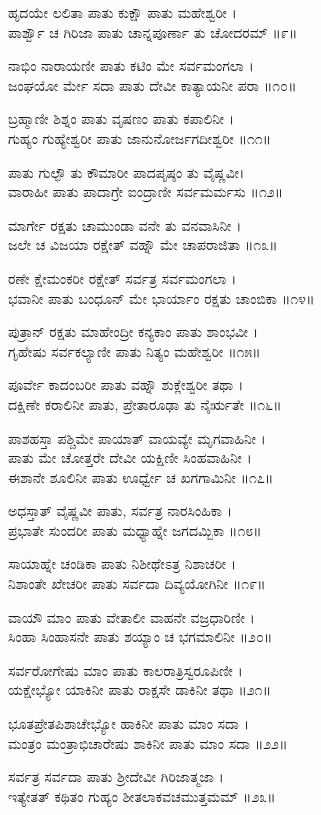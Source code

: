 ಹೃದಯೇ ಲಲಿತಾ ಪಾತು ಕುಕ್ಷೌ ಪಾತು ಮಹೇಶ್ವರೀ ।\\
ಪಾರ್ಶ್ವೌ ಚ ಗಿರಿಜಾ ಪಾತು ಚಾನ್ನಪೂರ್ಣಾ ತು ಚೋದರಮ್ ॥೯॥

ನಾಭಿಂ ನಾರಾಯಣೀ ಪಾತು ಕಟಿಂ ಮೇ ಸರ್ವಮಂಗಲಾ ।\\
ಜಂಘಯೋ ರ್ಮೇ ಸದಾ ಪಾತು ದೇವೀ ಕಾತ್ಯಾಯನೀ ಪರಾ ॥೧೦॥

ಬ್ರಹ್ಮಾಣೀ ಶಿಶ್ನಂ ಪಾತು ವೃಷಣಂ ಪಾತು ಕಪಾಲಿನೀ ।\\
ಗುಹ್ಯಂ ಗುಹ್ಯೇಶ್ವರೀ ಪಾತು ಜಾನುನೋರ್ಜಗದೀಶ್ವರೀ ॥೧೧॥

ಪಾತು ಗುಲ್ಫೌ ತು ಕೌಮಾರೀ ಪಾದಪೃಷ್ಠಂ ತು ವೈಷ್ಣವೀ।\\
ವಾರಾಹೀ ಪಾತು ಪಾದಾಗ್ರೇ ಐಂದ್ರಾಣೀ ಸರ್ವಮರ್ಮಸು ॥೧೨॥

ಮಾರ್ಗೇ ರಕ್ಷತು ಚಾಮುಂಡಾ ವನೇ ತು ವನವಾಸಿನೀ ।\\
ಜಲೇ ಚ ವಿಜಯಾ ರಕ್ಷೇತ್ ವಹ್ನೌ ಮೇ ಚಾಪರಾಜಿತಾ ॥೧೩॥

ರಣೇ ಕ್ಷೇಮಂಕರೀ ರಕ್ಷೇತ್ ಸರ್ವತ್ರ ಸರ್ವಮಂಗಲಾ ।\\
ಭವಾನೀ ಪಾತು ಬಂಧೂನ್ ಮೇ ಭಾರ್ಯಾಂ ರಕ್ಷತು ಚಾಂಬಿಕಾ ॥೧೪॥

ಪುತ್ರಾನ್ ರಕ್ಷತು ಮಾಹೇಂದ್ರೀ ಕನ್ಯಕಾಂ ಪಾತು ಶಾಂಭವೀ ।\\
ಗೃಹೇಷು ಸರ್ವಕಲ್ಯಾಣೀ ಪಾತು ನಿತ್ಯಂ ಮಹೇಶ್ವರೀ ॥೧೫॥

ಪೂರ್ವೇ ಕಾದಂಬರೀ ಪಾತು ವಹ್ನೌ ಶುಕ್ಲೇಶ್ವರೀ ತಥಾ ।\\
ದಕ್ಷಿಣೇ ಕರಾಲಿನೀ ಪಾತು, ಪ್ರೇತಾರೂಢಾ ತು ನೈರ್ಋತೇ ॥೧೬॥

ಪಾಶಹಸ್ತಾ ಪಶ್ಚಿಮೇ ಪಾಯಾತ್ ವಾಯವ್ಯೇ ಮೃಗವಾಹಿನೀ ।\\
ಪಾತು ಮೇ ಚೋತ್ತರೇ ದೇವೀ ಯಕ್ಷಿಣೀ ಸಿಂಹವಾಹಿನೀ ।\\
ಈಶಾನೇ ಶೂಲಿನೀ ಪಾತು ಊರ್ಧ್ವೇ ಚ ಖಗಗಾಮಿನೀ ॥೧೭॥

ಅಧಸ್ತಾತ್ ವೈಷ್ಣವೀ ಪಾತು, ಸರ್ವತ್ರ ನಾರಸಿಂಹಿಕಾ ।\\
ಪ್ರಭಾತೇ ಸುಂದರೀ ಪಾತು ಮಧ್ಯಾಹ್ನೇ ಜಗದಮ್ಬಿಕಾ ॥೧೮॥

ಸಾಯಾಹ್ನೇ ಚಂಡಿಕಾ ಪಾತು ನಿಶೀಥೇಽತ್ರ ನಿಶಾಚರೀ ।\\
ನಿಶಾಂತೇ ಖೇಚರೀ ಪಾತು ಸರ್ವದಾ ದಿವ್ಯಯೋಗಿನೀ ॥೧೯॥

ವಾಯೌ ಮಾಂ ಪಾತು ವೇತಾಲೀ ವಾಹನೇ ವಜ್ರಧಾರಿಣೀ ।\\
ಸಿಂಹಾ ಸಿಂಹಾಸನೇ ಪಾತು ಶಯ್ಯಾಂ ಚ ಭಗಮಾಲಿನೀ ॥೨೦॥

ಸರ್ವರೋಗೇಷು ಮಾಂ ಪಾತು ಕಾಲರಾತ್ರಿಸ್ವರೂಪಿಣೀ ।\\
ಯಕ್ಷೇಭ್ಯೋ ಯಾಕಿನೀ ಪಾತು ರಾಕ್ಷಸೇ ಡಾಕಿನೀ ತಥಾ ॥೨೧॥

ಭೂತಪ್ರೇತಪಿಶಾಚೇಭ್ಯೋ ಹಾಕಿನೀ ಪಾತು ಮಾಂ ಸದಾ ।\\
ಮಂತ್ರಂ ಮಂತ್ರಾಭಿಚಾರೇಷು ಶಾಕಿನೀ ಪಾತು ಮಾಂ ಸದಾ ॥೨೨॥

ಸರ್ವತ್ರ ಸರ್ವದಾ ಪಾತು ಶ್ರೀದೇವೀ ಗಿರಿಜಾತ್ಮಜಾ ।\\
ಇತ್ಯೇತತ್ ಕಥಿತಂ ಗುಹ್ಯಂ ಶೀತಲಾಕವಚಮುತ್ತಮಮ್ ॥೨೩॥

